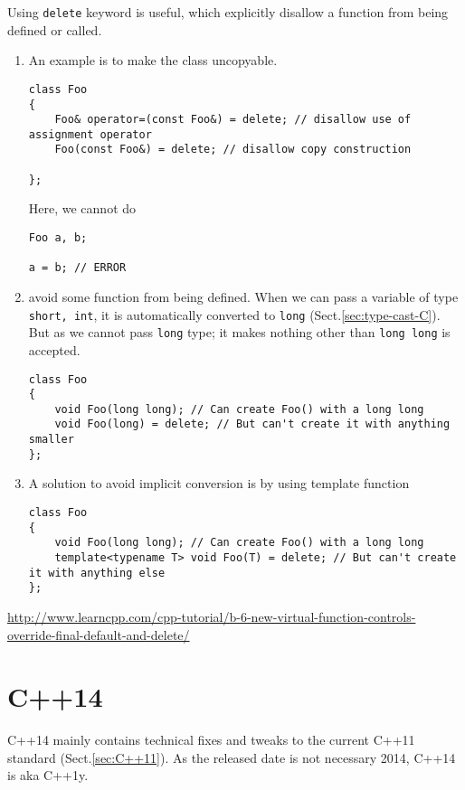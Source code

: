 Using \verb!delete! keyword is useful, which explicitly disallow a function from
being defined or called. 
\begin{enumerate}
  \item  An example is to make the class uncopyable.
\begin{Verbatim}
class Foo
{
    Foo& operator=(const Foo&) = delete; // disallow use of assignment operator
    Foo(const Foo&) = delete; // disallow copy construction
    
};
\end{Verbatim}
Here, we cannot do
\begin{verbatim}
Foo a, b;

a = b; // ERROR
\end{verbatim}
  
  \item avoid some function from being defined. When we can pass a variable of
  type \verb!short, int!, it is automatically converted to \verb!long!
  (Sect.\ref{sec:type-cast-C}). But as we cannot pass \verb!long! type; it makes
  nothing other than \verb!long long! is accepted.
  
\begin{Verbatim}
class Foo
{
    void Foo(long long); // Can create Foo() with a long long
    void Foo(long) = delete; // But can't create it with anything smaller
};
\end{Verbatim}

   \item A solution to avoid implicit conversion is by using template function
\begin{Verbatim}
class Foo
{
    void Foo(long long); // Can create Foo() with a long long
    template<typename T> void Foo(T) = delete; // But can't create it with anything else
};
\end{Verbatim}

\end{enumerate}

\url{http://www.learncpp.com/cpp-tutorial/b-6-new-virtual-function-controls-override-final-default-and-delete/}

\section{C++14}
\label{sec:C++14}

C++14 mainly contains technical fixes and tweaks to the current C++11 standard
(Sect.\ref{sec:C++11}). As the released date is not necessary 2014, C++14 is aka
C++1y.  

